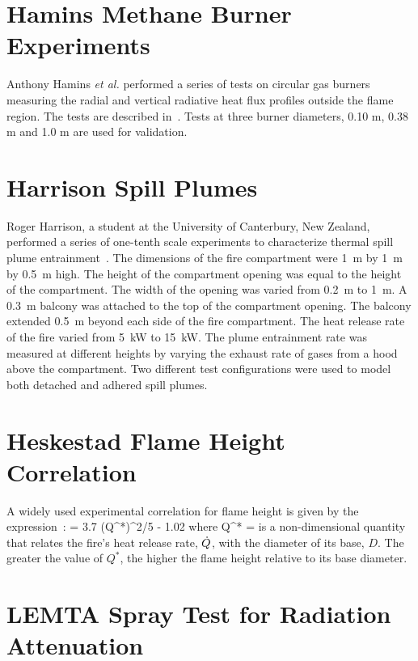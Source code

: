 \clearpage


\section{Hamins Methane Burner Experiments}

Anthony Hamins {\em et al.} performed a series of tests on circular gas
burners measuring the radial and vertical radiative heat flux profiles
outside the flame region. The tests are described
in~\cite{Hostikka:3}. Tests at three burner diameters, 0.10 m, 0.38 m
and 1.0 m are used for validation.


\section{Harrison Spill Plumes}

Roger Harrison, a student at the University of Canterbury, New Zealand, performed a series of one-tenth scale experiments to characterize thermal spill plume
entrainment~\cite{Harrison:2009,Harrison:IAFSS2008,Harrison:FT2007,Harrison:FSJ2010}. The dimensions of the fire compartment were 1~m by 1~m by 0.5~m high.
The height of the compartment opening was equal to the height of the compartment. The width of the opening was varied from 0.2~m to 1~m.
A 0.3~m balcony was attached to the top of the compartment opening. The balcony extended 0.5~m beyond each side of the fire compartment.
The heat release rate of the fire varied from 5~kW to 15~kW.
The plume entrainment rate was measured at different heights by varying the exhaust rate of gases from a hood above the compartment.
Two different test configurations were used to model both detached and adhered spill plumes.


\section{Heskestad Flame Height Correlation}

A widely used experimental correlation for flame height is given by the expression~\cite{Heskestad:FSJ1983,SFPE:Heskestad}:
\be {} = 3.7 \; (Q^*)^{2/5} - 1.02 \ee
where
\be Q^* =   \ee
is a non-dimensional quantity that relates the fire's heat release rate, $\dot{Q}$, with the diameter of its base, $D$. The greater the value of $Q^*$, the
higher the flame height relative to its base diameter.


\section{LEMTA Spray Test for Radiation Attenuation}

